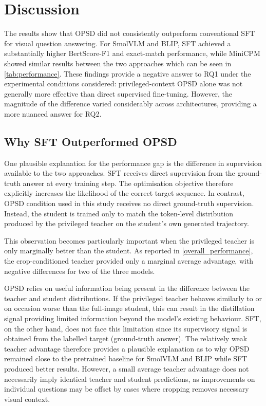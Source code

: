\section{Discussion}\label{discussion}

The results show that OPSD did not consistently outperform conventional SFT for visual question
answering. For SmolVLM and BLIP, SFT achieved a substantially higher BertScore-F1 and exact-match
performance, while MiniCPM showed similar results between the two approaches which can be seen in \autoref{tab:performance}. These findings
provide a negative answer to RQ1 under the experimental conditions considered: privileged-context
OPSD alone was not generally more effective than direct supervised fine-tuning. However, the magnitude
of the difference varied considerably across architectures, providing a more nuanced answer for RQ2.

\subsection{Why SFT Outperformed OPSD}

One plausible explanation for the performance gap is the difference in supervision available to the
two approaches. SFT receives direct supervision from the ground-truth answer at every training
step. The optimisation objective therefore explicitly increases the likelihood of the correct target
sequence. In contrast, OPSD condition used in this study receives no direct ground-truth supervision. Instead,
the student is trained only to match the token-level distribution produced by the privileged
teacher on the student's own generated trajectory.

This observation becomes particularly important when the privileged teacher is only marginally better
than the student. As reported in \autoref{overall_performance}, the crop-conditioned teacher provided only a marginal average advantage,
with negative differences for two of the three models. 

OPSD relies on useful information being present in the difference between the teacher and student
distributions. If the privileged teacher behaves similarly to or on occasion worse than the full-image
student, this can result in the distillation signal providing limited information beyond the model's 
existing behaviour. SFT, on the other hand, does not face this limitation since its supervisory signal
is obtained from the labelled target (ground-truth answer). The relatively weak teacher advantage
therefore provides a plausible explanation as to why OPSD remained close to the pretrained baseline for
SmolVLM and BLIP while SFT produced better results. However, a small average teacher advantage
does not necessarily imply identical teacher and student predictions, as improvements on individual 
questions may be offset by cases where cropping removes necessary visual context.

